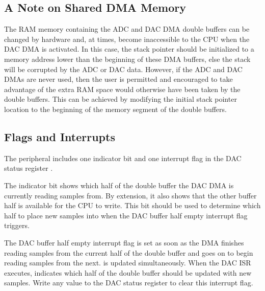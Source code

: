 \subsection{A Note on Shared DMA Memory}

The RAM memory containing the ADC and DAC DMA double buffers can be changed by hardware and, at times, become inaccessible to the CPU when the DAC DMA is activated. In this case, the stack pointer should be initialized to a memory address lower than the beginning of these DMA buffers, else the stack will be corrupted by the ADC or DAC data. However, if the ADC and DAC DMAs are never used, then the user is permitted and encouraged to take advantage of the extra RAM space would otherwise have been taken by the double buffers. This can be achieved by modifying the initial stack pointer location to the beginning of the memory segment of the double buffers.



\subsection{Flags and Interrupts}

The  peripheral includes one indicator bit and one interrupt flag in the DAC status register .

The  indicator bit shows which half of the double buffer the DAC DMA is currently reading samples from. By extension, it also shows that the other buffer half is available for the CPU to write. This bit should be used to determine which half to place new samples into when the DAC buffer half empty interrupt flag  triggers.

The DAC buffer half empty interrupt flag  is set as soon as the DMA finishes reading samples from the current half of the double buffer and goes on to begin reading samples from the next.  is updated simultaneously. When the DAC ISR executes,  indicates which half of the double buffer should be updated with new samples. Write any value to the DAC status register  to clear this interrupt flag.
